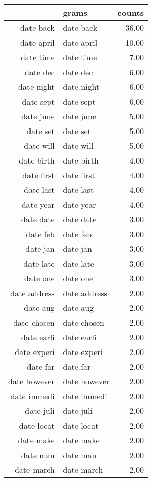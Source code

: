 \begin{table}[ht]
\centering
\begin{tabular}{rlr}
  \hline
 & grams & counts \\ 
  \hline
date back & date back & 36.00 \\ 
  date april & date april & 10.00 \\ 
  date time & date time & 7.00 \\ 
  date dec & date dec & 6.00 \\ 
  date night & date night & 6.00 \\ 
  date sept & date sept & 6.00 \\ 
  date june & date june & 5.00 \\ 
  date set & date set & 5.00 \\ 
  date will & date will & 5.00 \\ 
  date birth & date birth & 4.00 \\ 
  date first & date first & 4.00 \\ 
  date last & date last & 4.00 \\ 
  date year & date year & 4.00 \\ 
  date date & date date & 3.00 \\ 
  date feb & date feb & 3.00 \\ 
  date jan & date jan & 3.00 \\ 
  date late & date late & 3.00 \\ 
  date one & date one & 3.00 \\ 
  date address & date address & 2.00 \\ 
  date aug & date aug & 2.00 \\ 
  date chosen & date chosen & 2.00 \\ 
  date earli & date earli & 2.00 \\ 
  date experi & date experi & 2.00 \\ 
  date far & date far & 2.00 \\ 
  date however & date however & 2.00 \\ 
  date immedi & date immedi & 2.00 \\ 
  date juli & date juli & 2.00 \\ 
  date locat & date locat & 2.00 \\ 
  date make & date make & 2.00 \\ 
  date man & date man & 2.00 \\ 
  date march & date march & 2.00 \\ 

\end{tabular}
\end{table}
